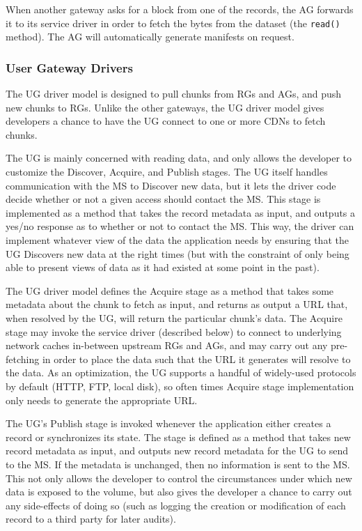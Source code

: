  When another gateway asks for a block from
one of the records, the AG forwards it to its service driver in order to fetch
the bytes from the dataset (the \texttt{read()} method).  The AG will
automatically generate manifests on request.

\subsubsection{User Gateway Drivers}

The UG driver model is designed to pull chunks from RGs and AGs, and push new
chunks to RGs.  Unlike the other gateways, the UG driver model gives developers
a chance to have the UG connect to one or more CDNs to fetch chunks.

  The UG is mainly concerned with reading
data, and only allows the developer to customize the Discover, Acquire, and
Publish stages.  The UG itself handles communication with the MS to Discover new data,
but it lets the driver code decide whether or not a given access should contact
the MS.  This stage is implemented as a method that takes the record metadata as
input, and outputs a yes/no response as to whether or not to contact the MS.
This way, the driver can implement
whatever view of the data the application needs by ensuring that the UG
Discovers new data at the right times (but with the constraint of only being
able to present views of data as it had existed at some point in the past).

The UG driver model defines the Acquire stage as a method that takes some
metadata about the chunk to fetch as input, and returns as output a
URL that, when resolved by the UG, will return the particular chunk's data.
The Acquire stage may invoke the service driver (described below) to connect to
underlying network caches in-between upstream RGs and AGs, and may carry out any
pre-fetching in order to place the data such that the URL it generates will
resolve to the data.  As an optimization, the
UG supports a handful of widely-used protocols by default (HTTP, FTP, local
disk), so often times Acquire stage implementation only needs to
generate the appropriate URL.

The UG's Publish stage is invoked whenever the application either creates a
record or synchronizes its state.  The stage is defined as a
method that takes new record metadata as input, and outputs new record metadata for the UG to
send to the MS.  If the metadata is unchanged, then no information is sent to
the MS.  This not only allows the developer to control the circumstances under which
new data is exposed to the volume, but also gives the developer a chance to
carry out any side-effects of doing so (such as logging the creation or
modification of each record to a third party for later audits).

